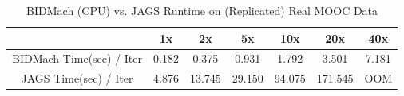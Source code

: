 \documentclass{article} %
\begin{document}
%
%
% 
%
%
\begin{table}[t]
\caption{BIDMach (CPU) vs. JAGS Runtime on (Replicated) Real MOOC Data}
\label{tab:bidmach_jags_realmooc}
\begin{center}
\begin{tabular}{ |c|c|c|c|c|c|c| } 
\hline
                         & 1x    & 2x     & 5x     & 10x    & 20x     & 40x   \\
\hline \hline
BIDMach Time(sec) / Iter & 0.182 & 0.375  & 0.931  & 1.792  & 3.501   & 7.181 \\ 
JAGS Time(sec) / Iter    & 4.876 & 13.745 & 29.150 & 94.075 & 171.545 & OOM   \\
\hline
\end{tabular}
\end{center}
\end{table}


%
%
\end{document}
